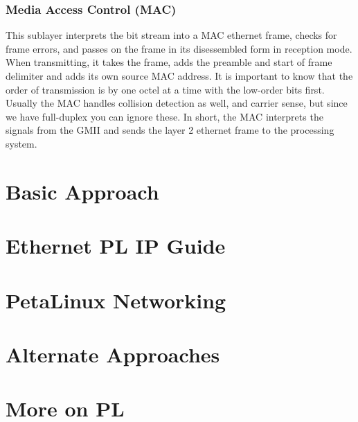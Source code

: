 \documentclass[12pt]{report}
\begin{document}
\subsection{Media Access Control (MAC)}
This sublayer interprets the bit stream into a MAC ethernet frame, checks for frame errors, and passes on the frame in its disessembled form in reception mode. When transmitting, it takes the frame, adds the preamble and start of frame delimiter and adds its own source MAC address. It is important to know that the order of transmission is by one octel at a time with the low-order bits first. Usually the MAC handles collision detection as well, and carrier sense, but since we have full-duplex you can ignore these. In short, the MAC interprets the signals from the GMII and sends the layer 2 ethernet frame to the processing system.

\chapter{Basic Approach}


\chapter{Ethernet PL IP Guide}

\chapter{PetaLinux Networking}

\chapter{Alternate Approaches}

\chapter{More on PL}
\end{document}
